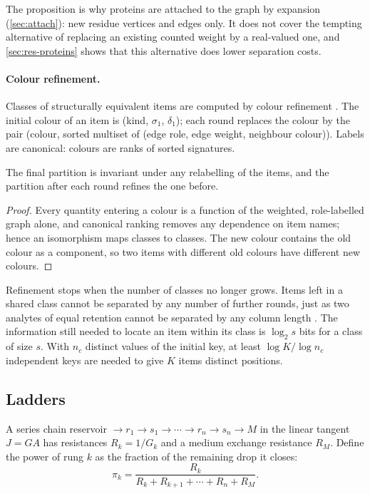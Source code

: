 The proposition is why proteins are attached to the graph by expansion (\cref{sec:attach}): new residue vertices and edges only.
It does not cover the tempting alternative of replacing an existing counted weight by a real-valued one, and \cref{sec:res-proteins} shows that this alternative does lower separation costs.

\paragraph{Colour refinement.}
Classes of structurally equivalent items are computed by colour refinement \citep{weisfeiler1968reduction}.
The initial colour of an item is (kind, $\sigma_1$, $\delta_1$); each round replaces the colour by the pair (colour, sorted multiset of (edge role, edge weight, neighbour colour)).
Labels are canonical: colours are ranks of sorted signatures.

\begin{proposition}
\label{prop:refine}
The final partition is invariant under any relabelling of the items, and the partition after each round refines the one before.
\end{proposition}
\begin{proof}
Every quantity entering a colour is a function of the weighted, role-labelled graph alone, and canonical ranking removes any dependence on item names; hence an isomorphism maps classes to classes.
The new colour contains the old colour as a component, so two items with different old colours have different new colours.
\end{proof}

Refinement stops when the number of classes no longer grows.
Items left in a shared class cannot be separated by any number of further rounds, just as two analytes of equal retention cannot be separated by any column length \citep{giddings1991unified}.
The information still needed to locate an item within its class is $\log_2 s$ bits for a class of size $s$.
With $n_c$ distinct values of the initial key, at least $\log K/\log n_c$ independent keys are needed to give $K$ items distinct positions.

\subsection{Ladders}
\label{sec:ladders}

A series chain reservoir $\to r_1\to s_1\to\cdots\to r_n\to s_n\to M$ in the linear tangent $J=GA$ has resistances $R_k=1/G_k$ and a medium exchange resistance $R_M$.
Define the power of rung $k$ as the fraction of the remaining drop it closes:
\begin{equation}
  \pi_k = \frac{R_k}{R_k+R_{k+1}+\cdots+R_n+R_M}.
\end{equation}

